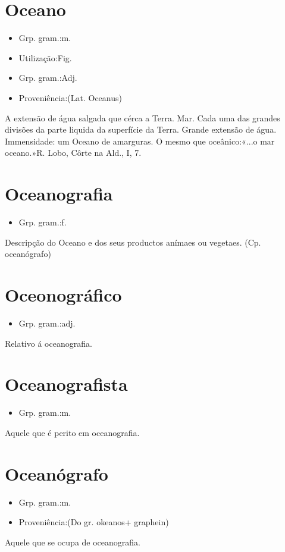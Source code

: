\section{Oceano}
\begin{itemize}
\item {Grp. gram.:m.}
\end{itemize}
\begin{itemize}
\item {Utilização:Fig.}
\end{itemize}
\begin{itemize}
\item {Grp. gram.:Adj.}
\end{itemize}
\begin{itemize}
\item {Proveniência:(Lat. \textunderscore Oceanus\textunderscore )}
\end{itemize}
A extensão de água salgada que cérca a Terra.
Mar.
Cada uma das grandes divisões da parte liquida da superfície da Terra.
Grande extensão de água.
Immensidade: \textunderscore um Oceano de amarguras\textunderscore .
O mesmo que \textunderscore oceânico\textunderscore :«\textunderscore ...o mar oceano.\textunderscore »R. Lobo, \textunderscore Côrte na Ald.\textunderscore , I, 7.
\section{Oceanografia}
\begin{itemize}
\item {Grp. gram.:f.}
\end{itemize}
Descripção do Oceano e dos seus productos anímaes ou vegetaes.
(Cp. \textunderscore oceanógrafo\textunderscore )
\section{Oceonográfico}
\begin{itemize}
\item {Grp. gram.:adj.}
\end{itemize}
Relativo á oceanografia.
\section{Oceanografista}
\begin{itemize}
\item {Grp. gram.:m.}
\end{itemize}
Aquele que é perito em oceanografia.
\section{Oceanógrafo}
\begin{itemize}
\item {Grp. gram.:m.}
\end{itemize}
\begin{itemize}
\item {Proveniência:(Do gr. \textunderscore okeanos\textunderscore  + \textunderscore graphein\textunderscore )}
\end{itemize}
Aquele que se ocupa de oceanografia.
